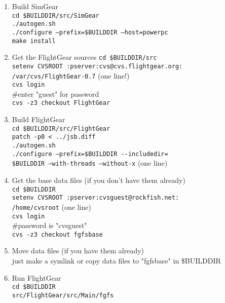 \begin{enumerate}
\item Build SimGear\\
 \texttt{cd {\$}BUILDDIR/src/SimGear}\\
 \texttt{./autogen.sh}\\
  \texttt{./configure --prefix={\$}BUILDDIR --host=powerpc}\\
 \texttt{make install}\\
 
\item Get the FlightGear sources
 \texttt{cd {\$}BUILDDIR/src}\\
 \texttt{setenv CVSROOT :pserver:cvs@cvs.flightgear.org:}\\
 \texttt{/var/cvs/FlightGear-0.7} (one line!)\\
 \texttt{cvs login}\\
 \#enter "guest" for password\\
 \texttt{cvs -z3 checkout FlightGear}

\item  Build FlightGear\\
 \texttt{cd {\$}BUILDDIR/src/FlightGear}\\
 \texttt{patch -p0 < ../jsb.diff}\\ 
 \texttt{./autogen.sh}\\
 \texttt{./configure --prefix={\$}BUILDDIR -$ $-includedir=}\\
 \texttt{{\$}BUILDDIR --with-threads --without-x} (one line)
 
\item Get the base data files (if you don't have them already)\\
 \texttt{cd {\$}BUILDDIR}\\
 \texttt{setenv CVSROOT :pserver:cvsguest@rockfish.net:}\\
 \texttt{/home/cvsroot} (one line)\\
 \texttt{cvs login}\\
 {\#}password is "cvsguest"\\
 \texttt{cvs -z3 checkout fgfsbase}

\item Move data files (if you have them already)\\
 just make a symlink or copy data files to "fgfsbase" in {\$}BUILDDIR

\item Run FlightGear\\
 \texttt{cd {\$}BUILDDIR}\\
 \texttt{src/FlightGear/src/Main/fgfs}
\end{enumerate}

